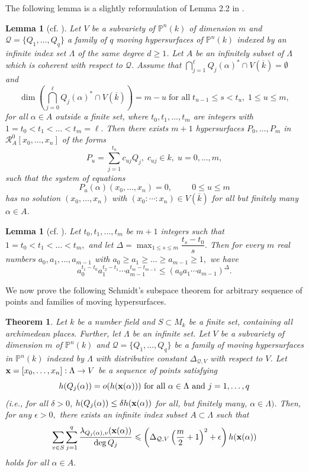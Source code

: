 \documentclass[12pt,leqno]{amsart}
\newtheorem{lemma}[equation]{Lemma}
\newtheorem{theorem}[equation]{Theorem}
\renewcommand{\P}{{\mathbb{P}}}
\numberwithin{equation}{section}
\begin{document}
The following lemma is a slightly reformulation of  Lemma 2.2 in \cite{CQT}.
\begin{lemma}[{cf. \cite[Lemma 2.2]{CQT}}]\label{2.2}
Let $V$ be a subvariety of $\mathbb P^n(k)$ of dimension $m$ and $\mathcal Q=\{Q_{1}, \ldots, Q_{q}\}$ a family of $q$ moving hypersurfaces of $\mathbb P^n(k)$ indexed by an infinite index set $\Lambda$ of the same degree $d\ge 1$. Let $A$ be an infinitely subset of $\Lambda$ which is coherent with respect to $\mathcal Q$. Assume that $\bigcap_{j=1}^{\ell}Q_j(\alpha)^*\cap V(\overline k)=\emptyset$ and
$$ \dim\left(\bigcap_{j=0}^{\ell}Q_j(\alpha)^*\cap V(\overline k)\right)=m-u\; \text{for all}\; t_{u-1}\leqslant s<t_u,\; 1\leqslant u\leqslant m, $$
for all $\alpha\in A$ outside a finite set, where $t_0,t_1,\dots,t_m$ are integers with $1=t_0<t_1<\dots<t_m=\ell.$ Then there exists $m+1$ hypersurfaces $P_0,\dots,P_m$ in $\mathcal R_{A}^{0}[x_0, \dots, x_n]$ of the forms
$$ P_u=\sum_{j=1}^{t_u}c_{uj}Q_j,\; c_{uj}\in k,\; u=0,\dots, m, $$
such that the system of equations
$$ P_{u} (\alpha)(x_0, \dots, x_n)=0, \hspace{1cm} 0\leqslant u \leqslant m$$
has no solution $(x_0,\dots,x_n)$ with $(x_0:\cdots:x_n) \in V(\overline k)$ for all but finitely many $\alpha \in A$.
\end{lemma}

\begin{lemma}[{cf. \cite[Lemma 3.9]{Q4}}]\label{2.3}
Let $t_0,t_1,\dots,t_m$  be $m+1$ integers such that $1=t_0<t_1<\dots<t_m,$ and let $\Delta=\max_{1\leqslant s\leqslant m}\dfrac{t_s-t_0}{s}.$ Then for every  $m$ real numbers $a_0,a_1,\dots,a_{m-1}$ with $a_0\ge a_1\ge \dots\ge a_{m-1}\ge 1,$ we have
$$ a_0^{t_1-t_0}a_1^{t_2-t_1}\cdots a_{m-1}^{t_m-t_{m-1}}\leqslant (a_0a_1\cdots a_{m-1})^{\Delta}.$$
\end{lemma}

We now prove the following Schmidt's subspace theorem for arbitrary sequence of points and families of moving hypersurfaces.
\begin{theorem}\label{2.4} Let $k$ be a number field and $S \subset M_k$ be a finite set, containing all archimedean places. Further, let $\Lambda$ be an infinite set. Let $V$ be a subvariety of dimension $m$ of $\P^n(k)$ and $\mathcal Q=\{Q_1,\dots, Q_q\}$ be a family of moving hypersurfaces in $\P^n(k)$ indexed by $\Lambda$ with distributive constant $\Delta_{\mathcal Q,V}$ with respect to $V$. Let ${\bf x}=[x_0,\ldots,x_n]:\Lambda \to V$ be a sequence of points satisfying
$$h(Q_j(\alpha))=o(h({\bf x}(\alpha))) \text{ for all }\alpha\in\Lambda \text{ and }j=1, \dots,q$$
(i.e., for all $\delta>0$,  $h(Q_j(\alpha))\leq\delta h({\bf x}(\alpha))$ for all, but finitely many, $\alpha\in \Lambda).$
Then, for any $\epsilon >0,$ there exists an infinite index subset $A\subset \Lambda$ such that
\begin{eqnarray*} \sum_{v\in S}\sum_{j=1}^{q}\frac{\lambda_{Q_j(\alpha), v}({\bf x}(\alpha))}{\deg Q_j}\leqslant \left(\Delta_{\mathcal Q,V}\left(\frac{m}{2}+1\right)^2+\epsilon\right)h({\bf x}(\alpha)
)\end{eqnarray*}
holds for all $\alpha \in A.$
\end{theorem}
\end{document}
